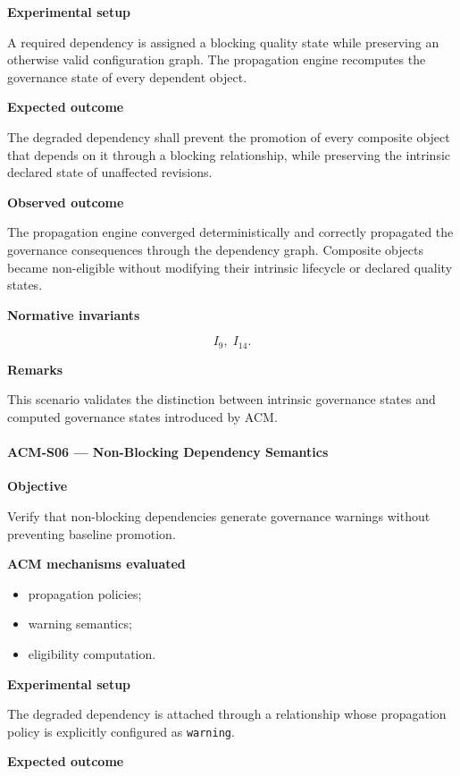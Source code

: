 \documentclass[10pt]{article}
\begin{document}
\textbf{Experimental setup}

A required dependency is assigned a blocking quality state while preserving an
otherwise valid configuration graph. The propagation engine recomputes the
governance state of every dependent object.

\textbf{Expected outcome}

The degraded dependency shall prevent the promotion of every composite object
that depends on it through a blocking relationship, while preserving the
intrinsic declared state of unaffected revisions.

\textbf{Observed outcome}

The propagation engine converged deterministically and correctly propagated the
governance consequences through the dependency graph. Composite objects became
non-eligible without modifying their intrinsic lifecycle or declared quality
states.

\textbf{Normative invariants}

\[
I_9,\;
I_{14}.
\]

\textbf{Remarks}

This scenario validates the distinction between intrinsic governance states and
computed governance states introduced by ACM.

\paragraph{ACM-S06 --- Non-Blocking Dependency Semantics}

\textbf{Objective}

Verify that non-blocking dependencies generate governance warnings without
preventing baseline promotion.

\textbf{ACM mechanisms evaluated}

\begin{itemize}
    \item propagation policies;
    \item warning semantics;
    \item eligibility computation.
\end{itemize}

\textbf{Experimental setup}

The degraded dependency is attached through a relationship whose propagation
policy is explicitly configured as \texttt{warning}.

\textbf{Expected outcome}
\end{document}

